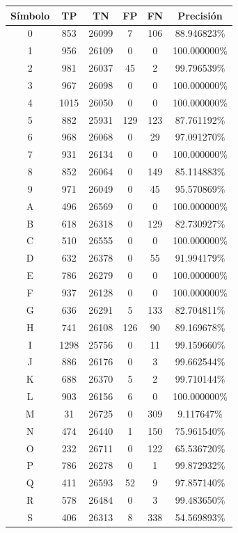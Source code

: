 \documentclass[a4paper, 11pt, oneside]{report}
\begin{document}
\begin{table}
\centering
\begin{tabular}{|c|c|c|c|c|c|}
	\hline
	Símbolo & TP & TN & FP & FN & Precisión \\ 
	\hline
	0 & 853 & 26099 & 7 & 106 & 88.946823\% \\ 
	1 & 956 & 26109 & 0 & 0 & 100.000000\% \\ 
	2 & 981 & 26037 & 45 & 2 & 99.796539\% \\ 
	3 & 967 & 26098 & 0 & 0 & 100.000000\% \\ 
	4 & 1015 & 26050 & 0 & 0 & 100.000000\% \\ 
	5 & 882 & 25931 & 129 & 123 & 87.761192\% \\ 
	6 & 968 & 26068 & 0 & 29 & 97.091270\% \\ 
	7 & 931 & 26134 & 0 & 0 & 100.000000\% \\ 
	8 & 852 & 26064 & 0 & 149 & 85.114883\% \\ 
	9 & 971 & 26049 & 0 & 45 & 95.570869\% \\ 
	A & 496 & 26569 & 0 & 0 & 100.000000\% \\ 
	B & 618 & 26318 & 0 & 129 & 82.730927\% \\ 
	C & 510 & 26555 & 0 & 0 & 100.000000\% \\ 
	D & 632 & 26378 & 0 & 55 & 91.994179\% \\ 
	E & 786 & 26279 & 0 & 0 & 100.000000\% \\ 
	F & 937 & 26128 & 0 & 0 & 100.000000\% \\ 
	G & 636 & 26291 & 5 & 133 & 82.704811\% \\ 
	H & 741 & 26108 & 126 & 90 & 89.169678\% \\ 
	I & 1298 & 25756 & 0 & 11 & 99.159660\% \\ 
	J & 886 & 26176 & 0 & 3 & 99.662544\% \\ 
	K & 688 & 26370 & 5 & 2 & 99.710144\% \\ 
	L & 903 & 26156 & 6 & 0 & 100.000000\% \\ 
	M & 31 & 26725 & 0 & 309 & 9.117647\% \\ 
	N & 474 & 26440 & 1 & 150 & 75.961540\% \\ 
	O & 232 & 26711 & 0 & 122 & 65.536720\% \\ 
	P & 786 & 26278 & 0 & 1 & 99.872932\% \\ 
	Q & 411 & 26593 & 52 & 9 & 97.857140\% \\ 
	R & 578 & 26484 & 0 & 3 & 99.483650\% \\ 
	S & 406 & 26313 & 8 & 338 & 54.569893\% \\ 

\end{tabular}
\end{table}
\end{document}
